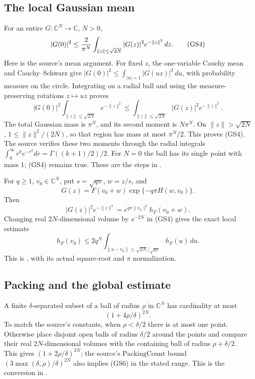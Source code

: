 \subsection{The local Gaussian mean}
For an entire \(G:\mathbb C^N\to\mathbb C\), \(N>0\),
\[
 |G(0)|^2\le {2\over\pi^N}
       \int_{\|z\|\le\sqrt{2N}}|G(z)|^2e^{-\|z\|^2}\,dz .
 \tag{GS4}\label{eq:sr-source-gaussian-ball-mean}
\]
Here is the source's mean argument.
For fixed \(z\), the one-variable Cauchy mean and
Cauchy--Schwarz give
\(|G(0)|^2\le\int_{|u|=1}|G(uz)|^2\,du\), with probability
measure on the circle.
Integrating on a radial ball and using the measure-preserving
rotations \(z\mapsto uz\) proves
\[
 |G(0)|^2\int_{\|z\|\le\sqrt{2N}}e^{-\|z\|^2}
       \le\int_{\|z\|\le\sqrt{2N}}|G(z)|^2e^{-\|z\|^2}.
\]
The total Gaussian mass is \(\pi^N\), and its second moment is
\(N\pi^N\). On \(\|z\|>\sqrt{2N}\),
\(1\le\|z\|^2/(2N)\), so that region has mass at most
\(\pi^N/2\).
This proves (GS4).
The source verifies these two moments through the radial
integrals
\(\int_0^\infty r^ke^{-r^2}dr=\Gamma((k+1)/2)/2\).
For \(N=0\) the ball has its single point with mass \(1\);
(GS4) remains true.
These are the steps in .

For \(q\ge1\), \(v_0\in\mathbb C^N\), put
\(s=\sqrt{q\pi}\), \(w=z/s\), and
\[
 G(z)=F(v_0+w)\exp\{-q\pi H(w,v_0)\}.
\]
Then
\[
 |G(z)|^2e^{-\|z\|^2}
              =e^{q\pi\|v_0\|^2}h_F(v_0+w).
\]
Changing real \(2N\)-dimensional volume by \(s^{-2N}\) in
(GS4) gives the exact local estimate
\[
 h_F(v_0)\le2q^N
       \int_{\|u-v_0\|\le\sqrt{2N}/\sqrt{q\pi}}h_F(u)\,du .
 \tag{GS5}\label{eq:sr-source-local-Gaussian}
\]
This is , with its actual square-root
and \(\pi\) normalization.

\subsection{Packing and the global estimate}
A finite \(\delta\)-separated subset of a ball of radius \(\rho\)
in \(\mathbb C^N\) has cardinality at most
\[
                         (1+4\rho/\delta)^{2N}.
 \tag{GS6}\label{eq:sr-source-complex-packing}
\]
To match the source's constants, when \(\rho<\delta/2\)
there is at most one point.
Otherwise place disjoint open balls of radius \(\delta/2\)
around the points and compare their real \(2N\)-dimensional
volumes with the containing ball of radius
\(\rho+\delta/2\). This gives
\((1+2\rho/\delta)^{2N}\); the source's
\(\mathrm{PackingCount}\) bound \( (3\max(\delta,\rho)/\delta)^{2N}\)
also implies (GS6) in the stated range.
This is the conversion in .

